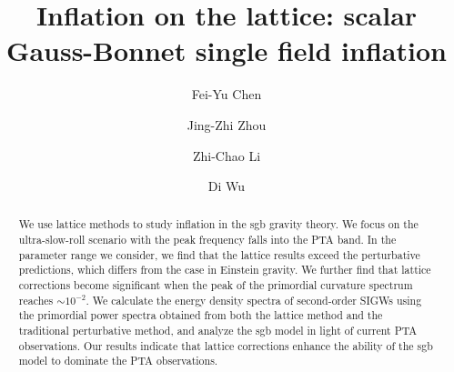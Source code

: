 \documentclass[reprint, 10pt, amsmath, amssymb, floatfix, aps, prd, superscriptaddress, nofootinbib, nobibnotes,twocolumn]{revtex4-1}
\begin{document}
\author{Fei-Yu Chen}

\author{Jing-Zhi Zhou}

\author{Zhi-Chao Li}

\author{Di Wu}

\begin{abstract}
	We use lattice methods to study inflation in the \ac{sgb} gravity theory. We focus on the ultra-slow-roll scenario with the peak frequency falls into the PTA band. In the parameter range we consider, we find that the lattice results exceed the perturbative predictions, which differs from the case in Einstein gravity. We further find that lattice corrections become significant when the peak of the primordial curvature spectrum reaches  $\sim 10^{-2}$. We calculate the energy density spectra of second-order \acp{SIGW} using the primordial power spectra obtained from both the lattice method and the traditional perturbative method, and analyze the \ac{sgb} model in light of current \ac{PTA} observations. Our results indicate that lattice corrections enhance the ability of the \ac{sgb} model to dominate the \ac{PTA} observations.
\end{abstract}
\title{Inflation on the lattice: scalar Gauss-Bonnet single field inflation}

\maketitle
\end{document}
